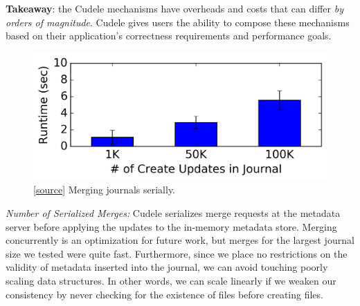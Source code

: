 \noindent\textbf{Takeaway}: the Cudele mechanisms have overheads and costs
that can differ {\it by orders of magnitude}. Cudele gives users the ability
to compose these mechanisms based on their application's correctness
requirements and performance goals.\\

\begin{figure}[tb]
\centering
\includegraphics[width=1.0\linewidth]{graphs/merge-a.png}
\caption{ [\href{https://...}{source}] Merging journals serially.}
\label{fig:merge}
\end{figure}


{\it Number of Serialized Merges:} Cudele serializes merge requests at the
metadata server before applying the updates to the in-memory metadata store.
Merging concurrently is an optimization for future work, but merges for the
largest journal size we tested were quite fast.  Furthermore, since we place no
restrictions on the validity of metadata inserted into the journal, we can
avoid touching poorly scaling data structures. In other words, we can scale
linearly if we weaken our consistency by never checking for the existence of
files before creating files.

